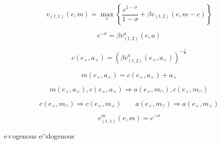 $$
    v_{(t,1)}(e, m) = \max_{c} \left\{\frac{c^{1-\sigma}}{1-\sigma}  + \beta v_{(t,2)}(e,m - c) \right\}
$$

$$
    c^{-\sigma} = \beta v_{(t,2)}^a(e,a) \tag{euler}
$$

$$
    c(e_\times,a_\times) = \left(\beta v_{(t,2)}^a(e_\times,a_\times)\right)^{-\frac{1}{\sigma}} \tag{egm}
$$

$$
    m(e_\times,a_\times) = c(e_\times,a_\times) + a_\times \tag{budget}
$$

$$
    m(e_\times,a_\times), c(e_\times, a_\times) \Rightarrow a(e_\times, m_\cap), c(e_\times,m_\cap) \tag{swap dims}
$$

$$
    c(e_\times,m_\cap) \Rightarrow c(e_\times, m_\times) \qquad a(e_\times, m_\cap) \Rightarrow a(e_\times, m_\times) \tag{regrid}
$$

$$
    v_{(t,1)}^m(e,m) = c^{-\sigma} \tag{ec}
$$

e$\times$ogenous e$\cap$dogenous
